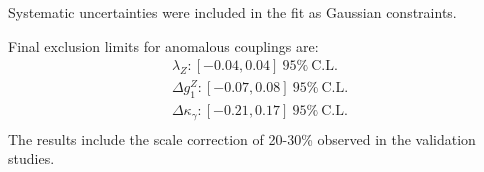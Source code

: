 




Systematic uncertainties were included in the fit as Gaussian
constraints.

Final exclusion limits for anomalous couplings are:
\begin{align}
  \lambda_{Z}: [-0.04,0.04]~95\%~\mathrm{C.L.}\\ 
  \Delta g^{Z}_1: [-0.07,0.08]~95\%~\mathrm{C.L.}\\
  \Delta\kappa_\gamma: [-0.21,0.17]~95\%~\mathrm{C.L.}\\
\end{align}
The results include the scale correction of 20-30\% observed in the validation studies.


